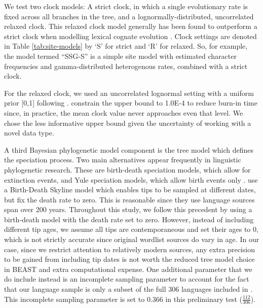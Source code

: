 We test two clock models: A strict clock, in which a single evolutionary rate is fixed across all branches in the tree, and a lognormally-distributed, uncorrelated relaxed clock. This relaxed clock model generally has been found to outperform a strict clock when modelling lexical cognate evolution \autocites{bouckaert_origin_2018}{kolipakam_bayesian_2018}. Clock settings are denoted in Table \ref{tab:site-models} by `S' for strict and `R' for relaxed. So, for example, the model termed ``SSG-S'' is a simple site model with estimated character frequencies and gamma-distributed heterogenous rates, combined with a strict clock.

For the relaxed clock, we used an uncorrelated lognormal setting with a uniform prior {[}0,1{]} following \textcite{kolipakam_bayesian_2018}. \textcite{bouckaert_origin_2018} constrain the upper bound to 1.0E-4 to reduce burn-in time since, in practice, the mean clock value never approaches even that level. We chose the less informative upper bound given the uncertainty of working with a novel data type.

A third Bayesian phylogenetic model component is the tree model which defines the speciation process. Two main alternatives appear frequently in linguistic phylogenetic research. These are birth-death speciation models, which allow for extinction events, and Yule speciation models, which allow birth events only \autocites[as preferred in][]{bowern_computational_2012}{kolipakam_bayesian_2018}. \textcite{bouckaert_origin_2018} use a Birth-Death Skyline model which enables tips to be sampled at different dates, but fix the death rate to zero. This is reasonable since they use language sources span over 200 years. Throughout this study, we follow this precedent by using a birth-death model with the death rate set to zero. However, instead of including different tip ages, we assume all tips are contemporaneous and set their ages to 0, which is not strictly accurate since original wordlist sources do vary in age. In our case, since we restrict attention to relatively modern sources, any extra precision to be gained from including tip dates is not worth the reduced tree model choice in BEAST and extra computational expense. One additional parameter that we do include instead is an incomplete sampling parameter to account for the fact that our language sample is only a subset of the full 306 languages included in \textcite{bouckaert_origin_2018}. This incomplete sampling parameter is set to 0.366 in this preliminary test (\(\frac{112}{306}\)).

